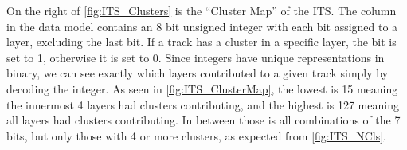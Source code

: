 On the right of \cref{fig:ITS_Clusters} is the ``Cluster Map'' of the ITS. The column in the data model contains an 8 bit unsigned integer with each bit assigned to a layer, excluding the last bit. If a track has a cluster in a specific layer, the bit is set to 1, otherwise it is set to 0. Since integers have unique representations in binary, we can see exactly which layers contributed to a given track simply by decoding the integer. As seen in \cref{fig:ITS_ClusterMap}, the lowest is 15 meaning the innermost 4 layers had clusters contributing, and the highest is 127 meaning all layers had clusters contributing. In between those is all combinations of the 7 bits, but only those with 4 or more clusters, as expected from \cref{fig:ITS_NCls}. 